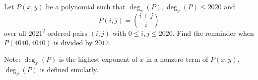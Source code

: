 Let $P(x,y)$ be a polynomial such that $\deg_x(P), \deg_y(P)\le 2020$ and \[P(i,j)=\binom{i+j}{i}\] over all $2021^2$ ordered pairs $(i,j)$ with $0\leq i,j\leq 2020$. Find the remainder when $P(4040, 4040)$ is divided by $2017$.

Note: $\deg_x (P)$ is the highest exponent of $x$ in a nonzero term of $P(x,y)$. $\deg_y (P)$ is defined similarly.

